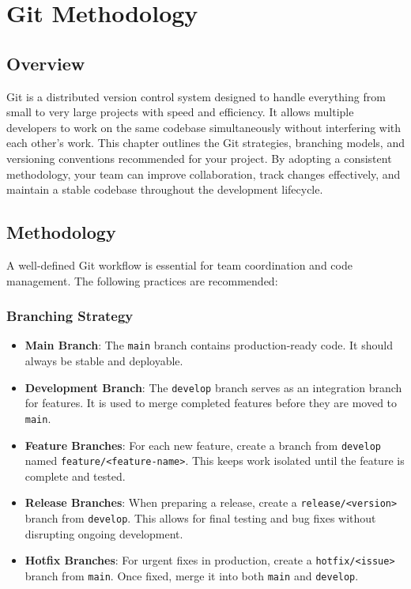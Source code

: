 \chapter{Git Methodology}

\section{Overview}
Git is a distributed version control system designed to handle everything from small to very large projects with speed and efficiency. It allows multiple developers to work on the same codebase simultaneously without interfering with each other's work. This chapter outlines the Git strategies, branching models, and versioning conventions recommended for your project. By adopting a consistent methodology, your team can improve collaboration, track changes effectively, and maintain a stable codebase throughout the development lifecycle.

\section{Methodology}
A well-defined Git workflow is essential for team coordination and code management. The following practices are recommended:

\subsection*{Branching Strategy}
\begin{itemize}
    \item \textbf{Main Branch}: The \texttt{main} branch contains production-ready code. It should always be stable and deployable.
    \item \textbf{Development Branch}: The \texttt{develop} branch serves as an integration branch for features. It is used to merge completed features before they are moved to \texttt{main}.
    \item \textbf{Feature Branches}: For each new feature, create a branch from \texttt{develop} named \texttt{feature/<feature-name>}. This keeps work isolated until the feature is complete and tested.
    \item \textbf{Release Branches}: When preparing a release, create a \texttt{release/<version>} branch from \texttt{develop}. This allows for final testing and bug fixes without disrupting ongoing development.
    \item \textbf{Hotfix Branches}: For urgent fixes in production, create a \texttt{hotfix/<issue>} branch from \texttt{main}. Once fixed, merge it into both \texttt{main} and \texttt{develop}.
\end{itemize}

